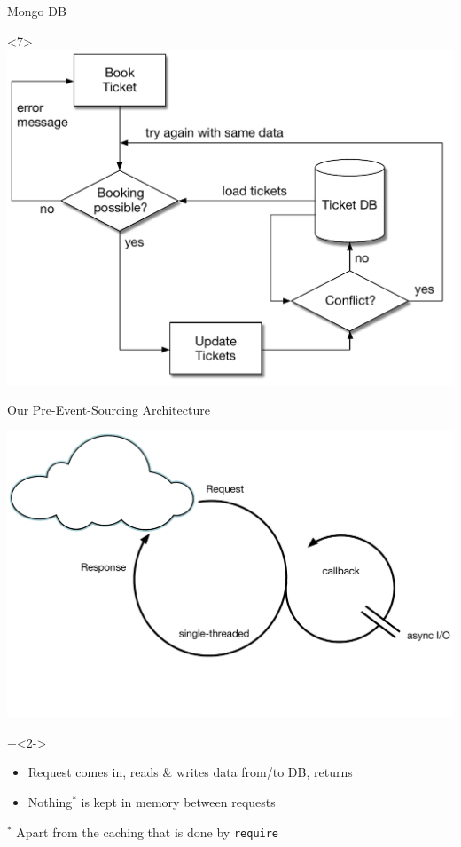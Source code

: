 \begin{frame}[fragile]{Mongo DB}
\begin{center}
\begin{onlyenv}<7>
\includegraphics[width=.85\textwidth]{../OptimisticLocking6.pdf}
\end{onlyenv}

\end{center}

\end{frame}

\begin{frame}[fragile]{Our Pre-Event-Sourcing Architecture}

\includegraphics[width=.7\textwidth]{../Nodejs3.pdf}

\onslide+<2->

\begin{itemize}
\item Request comes in, reads \& writes data from/to DB, returns
\item Nothing$^*$ is kept in memory between requests
\end{itemize}

{ \tiny $^*$ Apart from the caching that is done by \texttt{require} }
\end{frame}

